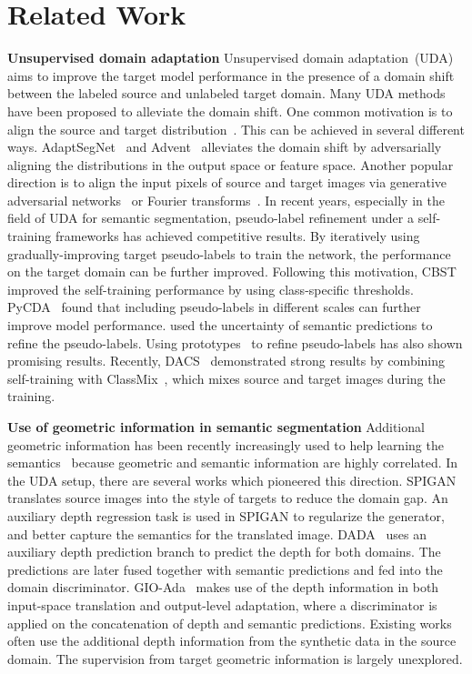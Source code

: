\documentclass[10pt,twocolumn,letterpaper]{article}
\begin{document}
\section{Related Work}

\textbf{Unsupervised domain adaptation} 
Unsupervised domain adaptation~(UDA)~\cite{pan2011domain, patel2015visual} aims to improve the target model performance in the presence of a domain shift between the labeled source and unlabeled target domain. Many UDA methods have been proposed  to alleviate the domain shift. One common motivation is to align the source and target distribution~\cite{ganin2014unsupervised}.  This can be achieved in several different ways. AdaptSegNet~\cite{Tsai_adaptseg_2018} and Advent~\cite{vu2018advent} alleviates the domain shift by adversarially aligning the distributions in the output space or feature space. Another popular direction is to align the input pixels of source and target images via generative adversarial networks~\cite{hoffman2018cycada} or Fourier transforms~\cite{yang2020fda}. In recent years, especially in the field of UDA for semantic segmentation, pseudo-label refinement under a self-training frameworks has achieved competitive results. By iteratively using gradually-improving target pseudo-labels to train the network, the performance on the target domain can be further improved. Following this motivation, CBST~\cite{zou2018domain} improved the self-training performance by using class-specific thresholds. PyCDA~\cite{Lian_2019_ICCV} found that including pseudo-labels in different scales can further improve model performance. \cite{zheng2020rectifying} used the uncertainty of semantic predictions to refine the pseudo-labels. Using prototypes~\cite{zhang2021prototypical} to refine pseudo-labels has also shown promising results. Recently, DACS~\cite{tranheden2020dacs} demonstrated strong results by combining self-training with ClassMix~\cite{olsson2021classmix}, which mixes source and target images during the training. 

\textbf{Use of geometric information in semantic segmentation} 
Additional geometric information has been recently increasingly used to help learning the semantics~\cite{Ramirez_2019_ICCV} because geometric and semantic information are highly correlated. In the UDA setup, there are several works which pioneered this direction. SPIGAN~\cite{lee2018spigan} translates source images into the style of targets to reduce the domain gap. An auxiliary depth regression task is used in SPIGAN to regularize the generator, and better capture the semantics for the translated image. DADA~\cite{vu2019dada} uses an auxiliary depth prediction branch to predict the depth for both domains. The predictions are later fused together with semantic predictions and fed into the domain discriminator. GIO-Ada~\cite{chen2019learning} makes use of the depth information in both input-space translation and output-level adaptation, where a discriminator is applied on the concatenation of depth and semantic predictions. Existing works often use the additional depth information from the synthetic data in the source domain. The supervision from target geometric information is largely unexplored.
\end{document}
